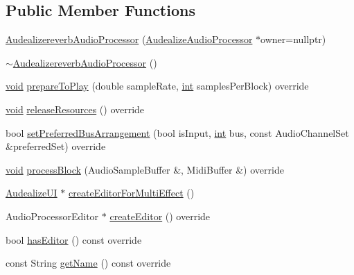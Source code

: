\subsection*{Public Member Functions}
\begin{DoxyCompactItemize}
\item 
\hyperlink{class_audealizereverb_audio_processor_ab13b216b97097d2cc33c4bccc4a02bcd}{Audealizereverb\+Audio\+Processor} (\hyperlink{class_audealize_1_1_audealize_audio_processor}{Audealize\+Audio\+Processor} $\ast$owner=nullptr)
\item 
\hyperlink{class_audealizereverb_audio_processor_a072bd395dad1b0ad6f027dce4b38ef84}{$\sim$\+Audealizereverb\+Audio\+Processor} ()
\item 
\hyperlink{tk_8h_aba408b7cd755a96426e004c015f5de8e}{void} \hyperlink{class_audealizereverb_audio_processor_a9487b00227e636a6fd543dbebb794f35}{prepare\+To\+Play} (double sample\+Rate, \hyperlink{tk_8h_a83f82f76e7fed06f4c49d2db94028a6d}{int} samples\+Per\+Block) override
\item 
\hyperlink{tk_8h_aba408b7cd755a96426e004c015f5de8e}{void} \hyperlink{class_audealizereverb_audio_processor_a43ca36f8e13479007f433b477b59b974}{release\+Resources} () override
\item 
bool \hyperlink{class_audealizereverb_audio_processor_a2c4ac43c34d351508db48853de9c9049}{set\+Preferred\+Bus\+Arrangement} (bool is\+Input, \hyperlink{tk_8h_a83f82f76e7fed06f4c49d2db94028a6d}{int} bus, const Audio\+Channel\+Set \&preferred\+Set) override
\item 
\hyperlink{tk_8h_aba408b7cd755a96426e004c015f5de8e}{void} \hyperlink{class_audealizereverb_audio_processor_a9af25624b77d56ded58de45556332390}{process\+Block} (Audio\+Sample\+Buffer \&, Midi\+Buffer \&) override
\item 
\hyperlink{class_audealize_1_1_audealize_u_i}{Audealize\+UI} $\ast$ \hyperlink{class_audealizereverb_audio_processor_aa784ca4a70eb061b53091a76feff6b68}{create\+Editor\+For\+Multi\+Effect} ()
\item 
Audio\+Processor\+Editor $\ast$ \hyperlink{class_audealizereverb_audio_processor_a84ceaa6c3bf26df9f6cd92550b823613}{create\+Editor} () override
\item 
bool \hyperlink{class_audealizereverb_audio_processor_ada6fb4aa0fa2889e3f2efb43c0599f32}{has\+Editor} () const  override
\item 
const String \hyperlink{class_audealizereverb_audio_processor_ab5ba301ae52e6114644445dba35d1a37}{get\+Name} () const  override
\item 

\end{DoxyCompactItemize}
